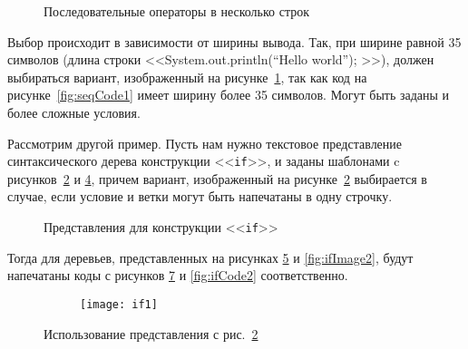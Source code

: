 \begin{figure}[h!]
	\centering
	
	\caption{Последовательные операторы в несколько строк}
	\label{fig:seqCode2}
\end{figure}

Выбор происходит в зависимости от ширины вывода. Так, при ширине равной 35 символов (длина строки <<System.out.println(“Hello world”); >>), должен выбираться вариант, изображенный на рисунке~\ref{fig:seqCode2}, так как код на рисунке~\ref{fig:seqCode1} имеет ширину более 35 символов.
Могут быть заданы и более сложные условия.

Рассмотрим другой пример. Пусть нам нужно текстовое представление синтаксического дерева конструкции <<\lstinline{if}>>, и заданы шаблонами c рисунков~\ref{fig:ifTemplate2} и \ref{fig:ifTemplate1}, причем вариант, изображенный на рисунке~\ref{fig:ifTemplate2} выбирается в случае, если условие и ветки могут быть напечатаны в одну строчку.

\begin{figure}[h!]
	\begin{subfigure}[b]{0.45\textwidth}
		
		\caption{}
		\label{fig:ifTemplate2}
	\end{subfigure}
	\hspace{1cm}
	\begin{subfigure}[b]{0.45\textwidth}
		
		\caption{}
		\label{fig:ifTemplate1}
	\end{subfigure}
	\caption{Представления для конструкции <<\lstinline{if}>>}
\end{figure}


Тогда для деревьев, представленных на рисунках \ref{fig:ifImage1} и \ref{fig:ifImage2}, будут напечатаны коды с рисунков \ref{fig:ifCode1} и \ref{fig:ifCode2} соответственно.

\begin{figure}[h!]
	\begin{subfigure}[b]{0.60\linewidth}
		\centering
		\texttt{[image: if1]}
		\caption{}
		\label{fig:ifImage1}
	\end{subfigure}
	\hspace{0.5cm}
	\begin{subfigure}[b]{0.30\linewidth}
		\centering
		
		\caption{}
		\label{fig:ifCode1}
	\end{subfigure}

	\caption{Использование представления с рис.~\ref{fig:ifTemplate2}}
\end{figure}

